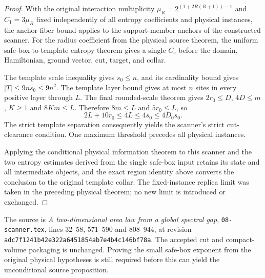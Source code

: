 \begin{proof}
    \leanok
    With the original interaction multiplicity
    $\mu_R=2^{(1+2R(R+1))-1}$ and $C_1=3\mu_R$ fixed independently of all
    entropy coefficients and physical instances, the anchor-fiber
    bound applies to the support-member anchors of the constructed scanner.
    For the radius coefficient from the physical source theorem, the
    uniform safe-box-to-template entropy theorem gives a single $C_e$
    before the domain, Hamiltonian, ground vector, cut, target, and collar.

    The template scale inequality gives $s_0\leq n$, and its
    cardinality bound gives $|T|\leq9ns_0\leq9n^2$.  The
    template layer bound gives at most $n$ sites in every positive layer
    through $L$.  The final rounded-scale theorem gives
    $2r_0\leq D$, $4D\leq m$, $K\geq1$ and $8Km\leq L$.
    Therefore $8m\leq L$ and $5r_0\leq L$, so
    \[
        2L+10r_0\leq4L\leq4s_0\leq4D_0s_0.
    \]
    The strict template separation consequently yields the scanner's
    strict cut-clearance condition.  One maximum threshold precedes all
    physical instances.

    Applying the conditional physical information theorem to this
    scanner and the two entropy estimates derived from the single
    safe-box input retains its state and all intermediate objects,
    and the exact region identity above converts the conclusion to the original
    template collar.  The fixed-instance replica limit was taken in the
    preceding physical theorem; no new limit is introduced or exchanged.
\end{proof}

The source is \emph{A two-dimensional area law from a global spectral gap},
\texttt{08-scanner.tex}, lines 32--58, 571--590 and 808--944, at revision
\texttt{adc7f1241b42e322a6451854ab7e4b4c146bf78a}.
The accepted cut and compact-volume packaging is unchanged.  Proving the
small safe-box exponent from the original physical hypotheses is still
required before this can yield the unconditional source proposition.
